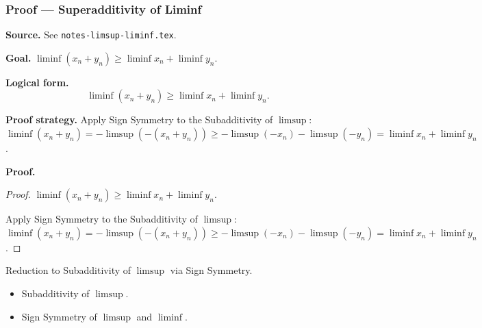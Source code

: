 
\clearpage
{}
\hypertarget{proof-RA-ABB-T-liminf-superadditive}{}

\subsubsection[Superadditivity of Liminf]{Proof --- Superadditivity of Liminf}

\bigskip

\noindent
\textbf{Source.} See \texttt{notes-limsup-liminf.tex}.

\vspace{0.75em}

\noindent
\textbf{Goal.} $\liminf(x_n + y_n) \ge \liminf x_n + \liminf y_n$.

\vspace{0.75em}

\noindent
\textbf{Logical form.}
\[
  \liminf(x_n + y_n) \ge \liminf x_n + \liminf y_n.
\]

\vspace{0.75em}

\noindent
\textbf{Proof strategy.} Apply Sign Symmetry to the Subadditivity of $\limsup$: $\liminf(x_n+y_n) = -\limsup(-(x_n+y_n)) \ge -\limsup(-x_n) - \limsup(-y_n) = \liminf x_n + \liminf y_n$.

\vspace{0.75em}

\noindent
\textbf{Proof.}
\begin{proof}
\Claim $\liminf(x_n + y_n) \ge \liminf x_n + \liminf y_n$.

\Given 

\Goal 

\Strategy Apply Sign Symmetry to the Subadditivity of $\limsup$: $\liminf(x_n+y_n) = -\limsup(-(x_n+y_n)) \ge -\limsup(-x_n) - \limsup(-y_n) = \liminf x_n + \liminf y_n$.

\medskip


\end{proof}

\begin{remark*}
Reduction to Subadditivity of $\limsup$ via Sign Symmetry.
\end{remark*}

\begin{remark*}[Dependencies]
\begin{itemize}
  \item Subadditivity of $\limsup$.
  \item Sign Symmetry of $\limsup$ and $\liminf$.
\end{itemize}
\end{remark*}

